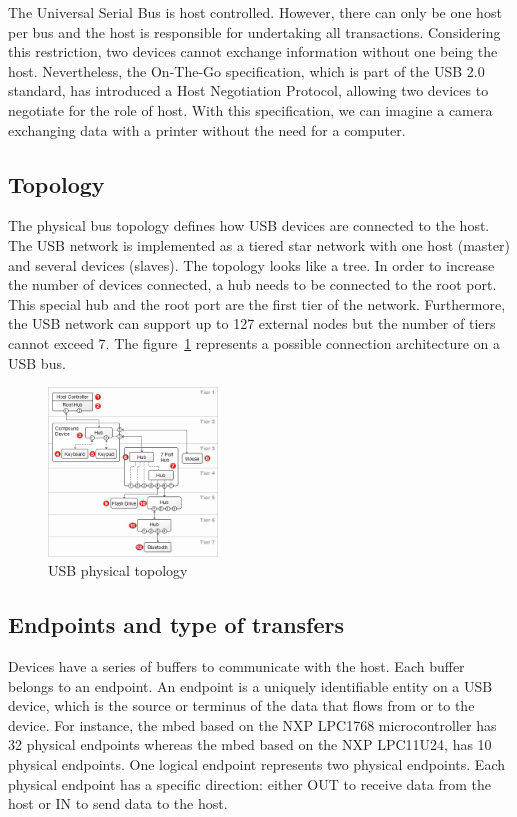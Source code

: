 \documentclass[pdftex,10pt,a4paper]{report}
\begin{document}
The Universal Serial Bus is host controlled. However, there can only be one host per bus and the host is responsible for undertaking all transactions. Considering this restriction, two devices cannot exchange information without one being the host. Nevertheless, the On-The-Go specification, which is part of the USB 2.0 standard, has introduced a Host Negotiation Protocol, allowing two devices to negotiate for the role of host. With this specification, we can imagine a camera exchanging data with a printer without the need for a computer. 

\subsection{Topology}
The physical bus topology defines how USB devices are connected to the host. The USB network is implemented as a tiered star network with one host (master) and several devices (slaves). The topology looks like a tree. In order to increase the number of devices connected, a hub needs to be connected to the root port. This special hub and the root port are the first tier of the network. Furthermore, the USB network can support up to 127 external nodes but the number of tiers cannot exceed 7. The figure~\ref{USB physical topology} represents a possible connection architecture on a USB bus.


\begin{figure}[h!]
		\centering
		\includegraphics[width=0.4\textwidth]{./usb_topology.jpg}
		\caption{USB physical topology}
		\label{USB physical topology}
\end{figure}
\subsection{Endpoints and type of transfers}
Devices have a series of buffers to communicate with the host. Each buffer belongs to an endpoint. An endpoint is a uniquely identifiable entity on a USB device, which is the source or terminus of the data that flows from or to the device. For instance, the mbed based on the NXP LPC1768 microcontroller has 32 physical endpoints whereas the mbed based on the NXP LPC11U24, has 10 physical endpoints. One logical endpoint represents two physical endpoints. Each physical endpoint has a specific direction: either OUT to receive data from the host or IN to send data to the host. 
\end{document}

